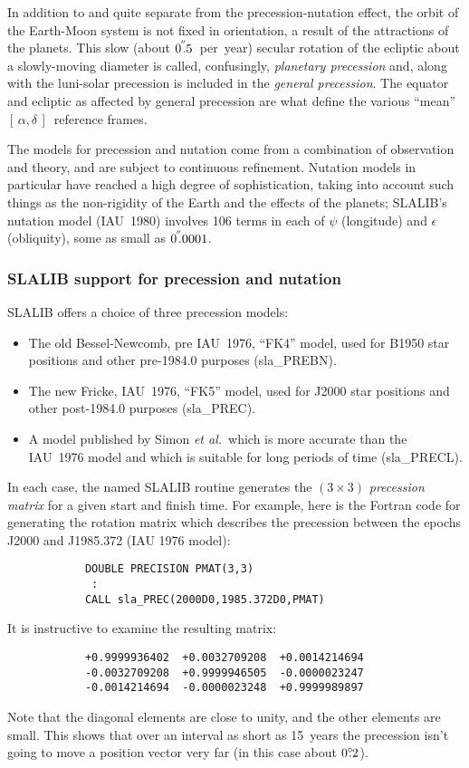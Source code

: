 \documentclass[11pt,twoside]{article}
\newcommand{\radec}     {$[\,\alpha,\delta\,]$}
\newcommand{\degree}[2] {$#1^{\circ}
                        \hspace{-0.37em}.\hspace{0.02em}#2$}
\newcommand{\arcsec}[2] {\arcseci{#1}$\hspace{-0.4em}.#2$}
\newcommand{\arcsec}[2] {
      {$#1\hspace{-0.05em}^{'\hspace{-0.1em}'}\hspace{-0.4em}.#2$}
   }
\newcommand{\arcseci}[1] {$#1\hspace{-0.05em}$\raisebox{-0.5ex}
                         {$^{'\hspace{-0.1em}'}$}}
\renewcommand{\arcseci}[1] {$#1\hspace{-0.05em}^{'\hspace{-0.1em}'}$}
\begin{document}
In addition to and quite separate
from the precession-nutation effect, the orbit of the Earth-Moon system
is not fixed in orientation, a result of the attractions of the
planets.  This slow (about \arcsec{0}{5}~per~year)
secular rotation of the ecliptic about a slowly-moving diameter is called,
confusingly, {\it planetary
precession}\/ and, along with the luni-solar precession is
included in the {\it general precession}.  The equator and
ecliptic as affected by general precession
are what define the various ``mean'' \radec\ reference frames.

The models for precession and nutation come from a combination
of observation and theory, and are subject to continuous
refinement.  Nutation models in particular have reached a high
degree of sophistication, taking into account such things as
the non-rigidity of the Earth and the effects of
the planets; SLALIB's nutation
model (IAU~1980) involves 106 terms in each of $\psi$ (longitude)
and $\epsilon$ (obliquity), some as small as \arcsec{0}{0001}.

\subsubsection{SLALIB support for precession and nutation}
SLALIB offers a choice of three precession models:
\begin{itemize}
\item The old Bessel-Newcomb, pre IAU~1976, ``FK4'' model, used for B1950
      star positions and other pre-1984.0 purposes
(sla\_PREBN).
\item The new Fricke, IAU~1976, ``FK5'' model, used for J2000 star
      positions and other post-1984.0 purposes
(sla\_PREC).
\item A model published by Simon {\it et al.}\ which is more accurate than
      the IAU~1976 model and which is suitable for long
      periods of time
(sla\_PRECL).
\end{itemize}
In each case, the named SLALIB routine generates the $(3\times3)$
{\it precession
matrix}\/ for a given start and finish time.  For example,
here is the Fortran code for generating the rotation
matrix which describes the precession between the epochs
J2000 and J1985.372 (IAU 1976 model):
\goodbreak
\begin{verbatim}
            DOUBLE PRECISION PMAT(3,3)
             :
            CALL sla_PREC(2000D0,1985.372D0,PMAT)
\end{verbatim}
\goodbreak
It is instructive to examine the resulting matrix:
\goodbreak
\begin{verbatim}
            +0.9999936402  +0.0032709208  +0.0014214694
            -0.0032709208  +0.9999946505  -0.0000023247
            -0.0014214694  -0.0000023248  +0.9999989897
\end{verbatim}
\goodbreak
Note that the diagonal elements are close to unity, and the
other elements are small.  This shows that over an interval as
short as 15~years the precession isn't going to move a
position vector very far (in this case about \degree{0}{2}).
\end{document}
